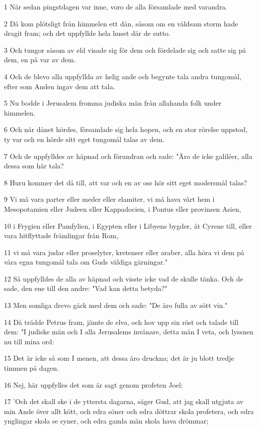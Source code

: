 \par 1 När sedan pingstdagen var inne, voro de alla församlade med varandra.
\par 2 Då kom plötsligt från himmelen ett dån, såsom om en våldsam storm hade dragit fram; och det uppfyllde hela huset där de sutto.
\par 3 Och tungor såsom av eld visade sig för dem och fördelade sig och satte sig på dem, en på var av dem.
\par 4 Och de blevo alla uppfyllda av helig ande och begynte tala andra tungomål, efter som Anden ingav dem att tala.
\par 5 Nu bodde i Jerusalem fromma judiska män från allahanda folk under himmelen.
\par 6 Och när dånet hördes, församlade sig hela hopen, och en stor rörelse uppstod, ty var och en hörde sitt eget tungomål talas av dem.
\par 7 Och de uppfylldes av häpnad och förundran och sade: "Äro de icke galiléer, alla dessa som här tala?
\par 8 Huru kommer det då till, att var och en av oss hör sitt eget modersmål talas?
\par 9 Vi må vara parter eller meder eller elamiter, vi må hava vårt hem i Mesopotamien eller Judeen eller Kappadocien, i Pontus eller provinsen Asien,
\par 10 i Frygien eller Pamfylien, i Egypten eller i Libyens bygder, åt Cyrene till, eller vara hitflyttade främlingar från Rom,
\par 11 vi må vara judar eller proselyter, kretenser eller araber, alla höra vi dem på våra egna tungomål tala om Guds väldiga gärningar."
\par 12 Så uppfylldes de alla av häpnad och visste icke vad de skulle tänka. Och de sade, den ene till den andre: "Vad kan detta betyda?"
\par 13 Men somliga drevo gäck med dem och sade: "De äro fulla av sött vin."
\par 14 Då trädde Petrus fram, jämte de elva, och hov upp sin röst och talade till dem: "I judiske män och I alla Jerusalems invånare, detta mån I veta, och lyssnen nu till mina ord:
\par 15 Det är icke så som I menen, att dessa äro druckna; det är ju blott tredje timmen på dagen.
\par 16 Nej, här uppfylles det som är sagt genom profeten Joel:
\par 17 'Och det skall ske i de yttersta dagarna, säger Gud, att jag skall utgjuta av min Ande över allt kött, och edra söner och edra döttrar skola profetera, och edra ynglingar skola se syner, och edra gamla män skola hava drömmar;
